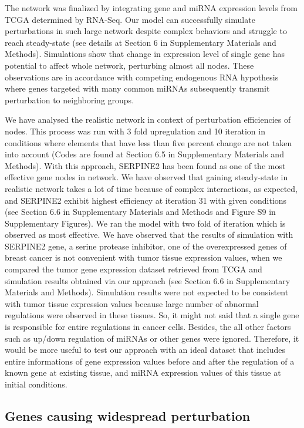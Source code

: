 \documentclass[a4,center,fleqn]{NAR}
\begin{document}
The network was finalized by integrating gene and miRNA expression
levels from TCGA determined by RNA-Seq. Our model can successfully
simulate perturbations in such large network despite complex behaviors
and struggle to reach steady-state (see details at Section 6 in
Supplementary Materials and Methods). Simulations show that change in
expression level of single gene has potential to affect whole network,
perturbing almost all nodes. These observations are in accordance with
competing endogenous RNA hypothesis where genes targeted with many
common miRNAs subsequently transmit perturbation to neighboring groups.

We have analysed the realistic network in context of perturbation
efficiencies of nodes. This process was run with 3 fold upregulation and
10 iteration in conditions where elements that have less than five
percent change are not taken into account (Codes are found at Section
6.5 in Supplementary Materials and Methods). With this approach,
SERPINE2 has been found as one of the most effective gene nodes in
network. We have observed that gaining steady-state in realistic network
takes a lot of time because of complex interactions, as expected, and
SERPINE2 exhibit highest efficiency at iteration 31 with given
conditions (see Section 6.6 in Supplementary Materials and Methods and
Figure S9 in Supplementary Figures). We ran the model with two fold of
iteration which is observed as most effective. We have observed that the
results of simulation with SERPINE2 gene, a serine protease inhibitor,
one of the overexpressed genes of breast cancer
\citep{yang2018expression, candia2006protease} is not convenient with
tumor tissue expression values, when we compared the tumor gene
expression dataset retrieved from TCGA and simulation results obtained
via our approach (see Section 6.6 in Supplementary Materials and
Methods). Simulation results were not expected to be consistent with
tumor tissue expression values because large number of abnormal
regulations were observed in these tissues. So, it might not said that a
single gene is responsible for entire regulations in cancer cells.
Besides, the all other factors such as up/down regulation of miRNAs or
other genes were ignored. Therefore, it would be more useful to test our
approach with an ideal dataset that includes entire informations of gene
expression values before and after the regulation of a known gene at
existing tissue, and miRNA expression values of this tissue at initial
conditions.

\subsection{Genes causing widespread perturbation}
\end{document}
